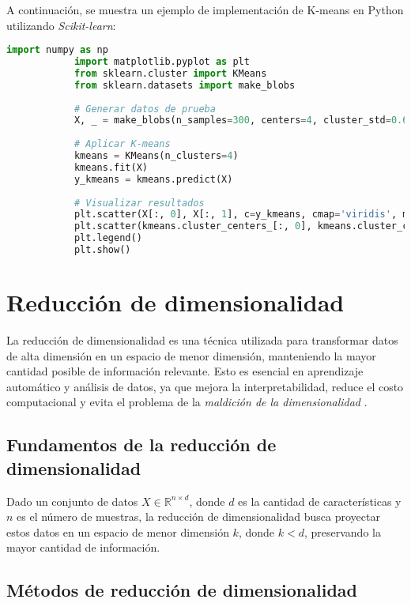 \begin{itemize}
		A continuación, se muestra un ejemplo de implementación de K-means en Python utilizando \textit{Scikit-learn}:
		
		\begin{lstlisting}[language=Python, caption={Clustering con K-means en Python}]
			import numpy as np
			import matplotlib.pyplot as plt
			from sklearn.cluster import KMeans
			from sklearn.datasets import make_blobs
			
			# Generar datos de prueba
			X, _ = make_blobs(n_samples=300, centers=4, cluster_std=0.60, random_state=0)
			
			# Aplicar K-means
			kmeans = KMeans(n_clusters=4)
			kmeans.fit(X)
			y_kmeans = kmeans.predict(X)
			
			# Visualizar resultados
			plt.scatter(X[:, 0], X[:, 1], c=y_kmeans, cmap='viridis', marker='o')
			plt.scatter(kmeans.cluster_centers_[:, 0], kmeans.cluster_centers_[:, 1], s=200, c='red', marker='X', label='Centroides')
			plt.legend()
			plt.show()
		\end{lstlisting}
		\section{Reducción de dimensionalidad}
		
		La reducción de dimensionalidad es una técnica utilizada para transformar datos de alta dimensión en un espacio de menor dimensión, manteniendo la mayor cantidad posible de información relevante. Esto es esencial en aprendizaje automático y análisis de datos, ya que mejora la interpretabilidad, reduce el costo computacional y evita el problema de la \textit{maldición de la dimensionalidad} \cite{jolliffe2016principal}.
		
		\subsection{Fundamentos de la reducción de dimensionalidad}
		
		Dado un conjunto de datos \( X \in \mathbb{R}^{n \times d} \), donde \( d \) es la cantidad de características y \( n \) es el número de muestras, la reducción de dimensionalidad busca proyectar estos datos en un espacio de menor dimensión \( k \), donde \( k < d \), preservando la mayor cantidad de información.
		
		\subsection{Métodos de reducción de dimensionalidad}
		

\end{itemize}
